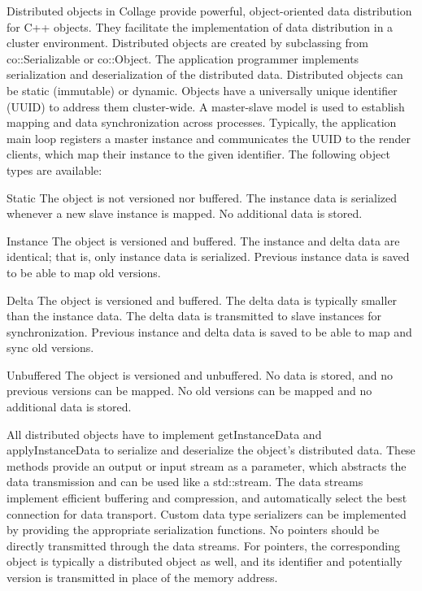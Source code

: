 \documentclass[10pt,journal,compsoc]{IEEEtran}
\begin{document}
Distributed objects in \textsf{Collage} provide powerful, object-oriented data
distribution for C++ objects. They facilitate the implementation of data
distribution in a cluster environment. Distributed objects are created by
subclassing from \textsf{co::Serializable} or \textsf{co::Object}. The
application programmer implements serialization and deserialization of the
distributed data. Distributed objects can be static (immutable) or
dynamic. Objects have a universally unique identifier (UUID) to address them
cluster-wide. A master-slave model is used to establish mapping and data
synchronization across processes. Typically, the application main loop registers
a master instance and communicates the UUID to the render clients, which map
their instance to the given identifier. The following object types are
available:

\begin{compactdesc}
\item[Static] The object is not versioned nor buffered. The instance data is
  serialized whenever a new slave instance is mapped. No additional data is
  stored.
\item[Instance] The object is versioned and buffered. The instance and delta
  data are identical; that is, only instance data is serialized. Previous
  instance data is saved to be able to map old versions.
\item[Delta] The object is versioned and buffered. The delta data is typically
  smaller than the instance data. The delta data is transmitted to slave
  instances for synchronization. Previous instance and delta data is saved to be
  able to map and sync old versions.
\item[Unbuffered] The object is versioned and unbuffered. No data is stored, and
  no previous versions can be mapped. No old versions can be mapped and no
  additional data is stored.
\end{compactdesc}

All distributed objects have to implement \textsf{getInstanceData} and
\textsf{applyInstanceData} to serialize and deserialize the object's distributed
data. These methods provide an output or input stream as a parameter, which
abstracts the data transmission and can be used like a \textsf{std::stream}.
The data streams implement efficient buffering and compression, and
automatically select the best connection for data transport. Custom data type
serializers can be implemented by providing the appropriate serialization
functions. No pointers should be directly transmitted through the data
streams. For pointers, the corresponding object is typically a distributed
object as well, and its identifier and potentially version is transmitted in
place of the memory address.
\end{document}
